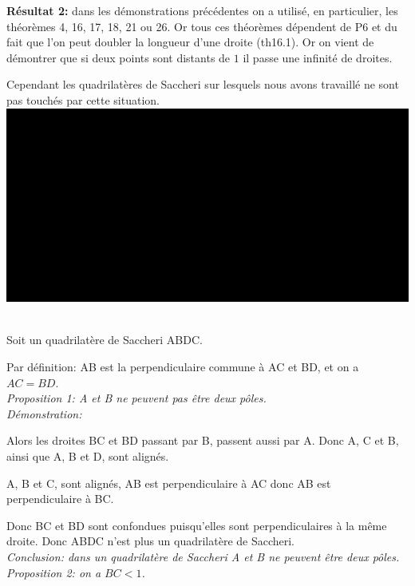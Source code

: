 \documentclass[a4paper, 12pt, twoside]{book}
\begin{document}
    \textbf{Résultat 2:} dans les démonstrations précédentes on a utilisé,  en particulier, les théorèmes 4, 16, 17, 18, 21 ou 26. Or tous ces théorèmes dépendent de P6 et du fait que l'on peut doubler la longueur d'une droite (th16.1). Or on vient de démontrer que si deux points sont distants de $1$ il passe une infinité de droites.\
    
    Cependant les quadrilatères de Saccheri sur lesquels nous avons travaillé ne sont pas touchés par cette situation.\\
    
    
  \includegraphics[scale=0.3]{figures/sacc41.eps}\ 
   
  Soit un quadrilatère de Saccheri ABDC.\
  
  Par définition:  AB est la perpendiculaire commune à AC et BD, et on a $AC=BD$.\\
  
  
  \textit{Proposition 1: A et B ne peuvent pas \^{e}tre  deux pôles.}\\
  
  \textit{Démonstration:}\
  
  Alors les droites BC et BD passant par B, passent aussi par A. Donc A, C et B, ainsi que A, B et D, sont alignés.\
  
     A, B et C, sont alignés, AB est perpendiculaire à AC donc  AB est perpendiculaire à BC. \
     
     Donc BC et BD sont confondues puisqu'elles sont perpendiculaires à la même droite. Donc ABDC n'est plus un quadrilatère de Saccheri.\\
     
     \textit{Conclusion: dans un quadrilatère de Saccheri A et B ne peuvent être deux pôles. }\\
     
     \textit{Proposition 2: on a $BC<1$. } \\
     
\end{document}
